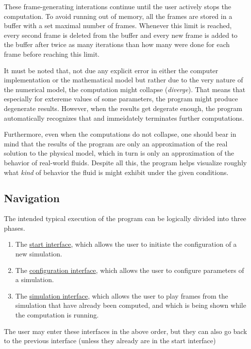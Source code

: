 \documentclass{article}
\newcommand{\vxlisp}{\vspace*{12pt}}
\begin{document}
These frame-generating interations continue until the user actively stops the computation. To avoid running out of memory, all the frames are stored in a buffer with a set maximal number of frames. Whenever this limit is reached, every second frame is deleted from the buffer and every new frame is added to the buffer after twice as many iterations than how many were done for each frame before reaching this limit.

It must be noted that, not due any explicit error in either the computer implementation or the mathematical model but rather due to the very nature of the numerical model, the computation might collapse (\emph{diverge}). That means that especially for extereme values of some parameters, the program might produce degenerate results. However, when the results get degerate enough, the program automatically recognizes that and immeidately terminates further computations.
\vxlisp

Furthermore, even when the computations do not collapse, one should bear in mind that the results of the program are only an approximation of the real solution to the physical model, which in turn is only an approximation of the behavior of real-world fluids. Despite all this, the program helps visualize roughly what \emph{kind} of behavior the fluid is might exhibit under the given conditions.

\newcommand{\inull}{start interface}
\newcommand{\Inull}{Start Interface}
\newcommand{\ione}{configuration interface}
\newcommand{\Ione}{Configuration Interface}
\newcommand{\itwo}{simulation interface}
\newcommand{\Itwo}{Simulation Interface}
\newcommand{\iexv}{video export interface}
\newcommand{\Iexv}{Video Export Interface}

\subsection{Navigation}
The intended typical execution of the program can be logically divided into three phases.
\begin{enumerate}
	\item The \hyperref[sec:i0]{\inull}, which allows the user to initiate the configuration of a new simulation.
	\item The \hyperref[sec:i1]{\ione}, which allows the user to configure parameters of a simulation.
	\item The \hyperref[sec:i2]{\itwo}, which allows the user to play frames from the simulation that have already been computed, and which is being shown while the computation is running.
\end{enumerate}
The user may enter these interfaces in the above order, but they can also go back to the previous interface (unless they already are in the start interface)
\end{document}
